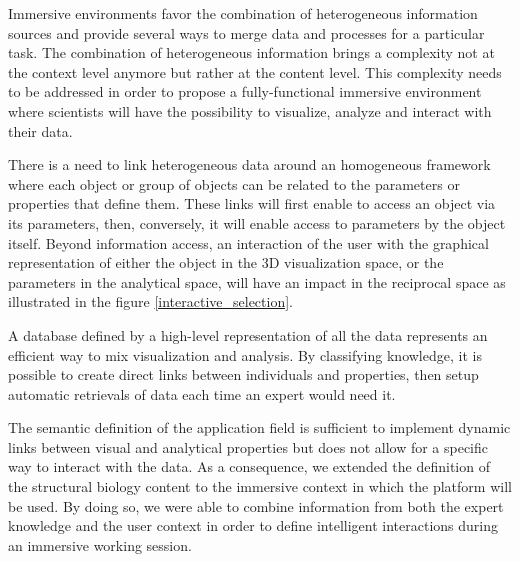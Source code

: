 \documentclass{vgtc}                          %
\begin{document}
Immersive environments favor the combination of heterogeneous information sources and provide several ways to merge data and processes for a particular task. The combination of heterogeneous information brings a complexity not at the context level anymore but rather at the content level. This complexity needs to be addressed in order to propose a fully-functional immersive environment where scientists will have the possibility to visualize, analyze and interact with their data.

There is a need to link heterogeneous data around an homogeneous framework where each object or group of objects can be related to the parameters or properties that define them. These links will first enable to access an object via its parameters, then, conversely, it will enable access to parameters by the object itself. Beyond information access, an interaction of the user with the graphical representation of either the object in the 3D visualization space, or the parameters in the analytical space, will have an impact in the reciprocal space as illustrated in the figure \ref{interactive_selection}.

A database defined by a high-level representation of all the data represents an efficient way to mix visualization and analysis. By classifying knowledge, it is possible to create direct links between individuals and properties, then setup automatic retrievals of data each time an expert would need it.

The semantic definition of the application field is sufficient to implement dynamic links between visual and analytical properties but does not allow for a specific way to interact with the data. As a consequence, we extended the definition of the structural biology content to the immersive context in which the platform will be used.
By doing so, we were able to combine information from both the expert knowledge and the user context in order to define intelligent interactions during an immersive working session.

\end{document}
